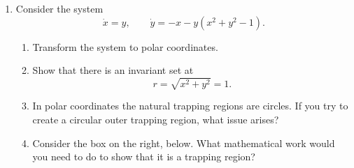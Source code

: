 \documentclass[12pt]{amsart}
\theoremstyle{plain}
\theoremstyle{definition}
\theoremstyle{definition}
\theoremstyle{plain}
\newenvironment{solution}
{\begin{proof}[Solution]}
{\end{proof}}
\begin{document}
\begin{enumerate}
\begin{solution}
\begin{enumerate}[label=(\alph*)]
        \item Choose an annulus
        \[
            0<r_0\leq r\leq4
        \]
        with, for example, $r_0=\tfrac12$. On the outer boundary $r=4$, part (b)
        shows that $\dot r<0$, so trajectories point into the annulus. On the
        inner boundary $r=\tfrac12$,
        \[
            \dot r=\frac12\left(2-\sin\theta-\frac12\right)
            =\frac12\left(\frac32-\sin\theta\right)>0,
        \]
        since $\sin\theta\leq1$. Thus trajectories also point into the annulus
        across its inner boundary. Therefore
        \[
            \tfrac12\leq r\leq4
        \]
        is a compact positively invariant trapping region. It excludes the
        equilibrium at $r=0$, so it has the form needed for an application of the
        Poincar\'e--Bendixson theorem.
            \end{enumerate}
        \end{solution}

        \item Consider the system
        \[
            \dot x = y,
            \qquad
            \dot y = -x-y(x^2+y^2-1).
        \]

        \begin{enumerate}[label=(\alph*)]
        \item Transform the system to polar coordinates.

        \item Show that there is an invariant set at
        \[
            r=\sqrt{x^2+y^2}=1.
        \]

        \item In polar coordinates the natural trapping regions are circles. If you try to create a circular outer trapping region, what issue arises?

        \item Consider the box on the right, below. What mathematical work would you need to do to show that it is a trapping region?


\end{enumerate}
\end{enumerate}
\end{document}
